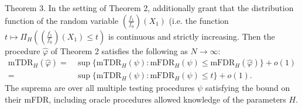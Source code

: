 \documentclass[10pt, aspectratio=169]{beamer}
\begin{document}
\begin{frame}
   \begin{mytheorembox}{Theorem 3.}
        In the setting of Theorem 2, additionally grant that the distribution function of the
        random variable \( \left( \frac{f_1}{f_0} \right) (X_1) \) (i.e. the function \( t \mapsto \Pi_H \left( \left( \frac{f_1}{f_0} \right) (X_1) \leq t \right) \) is continuous and strictly
        increasing. Then the procedure \( \hat{\varphi} \) of Theorem 2 satisfies the following as \( N \to \infty \):
        \begin{equation*}
            \begin{split}
            \text{mTDR}_H(\hat{\varphi}) = &\sup \{ \text{mTDR}_H(\psi) : \text{mFDR}_H(\psi) \leq \text{mFDR}_H(\hat{\varphi}) \} + o(1) \\
            = &\sup \{ \text{mTDR}_H(\psi) : \text{mFDR}_H(\psi) \leq t \} + o(1).
            \end{split}
        \end{equation*}
        The suprema are over all multiple testing procedures \( \psi \) satisfying the bound on their mFDR, including
        oracle procedures allowed knowledge of the parameters \( H \).
    \end{mytheorembox}
\end{frame}
\end{document}
